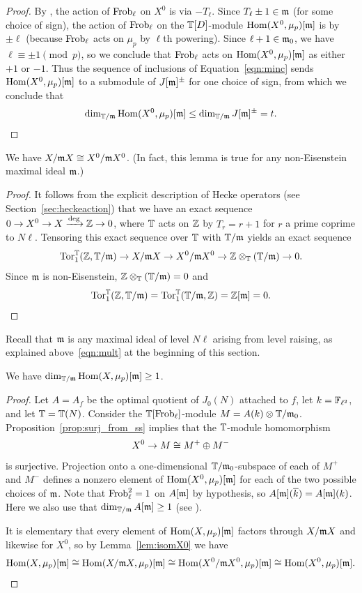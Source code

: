 \documentclass{article} \usepackage[active]{srcltx}
\begin{document}
\begin{proof}
By \cite[Prop.~3.7--3.8]{ribet:modreps}, the action 
of $\operatorname{Frob}_{\ell}$ on $X^0$ is via $-T_{\ell}$.
Since $T_{\ell}\pm 1\in \mathfrak{m}$ (for some choice of sign),
the action of $\operatorname{Frob}_{\ell}$ on the $\mathbb{T}[D]$-module
$\operatorname{Hom}(X^0,  \mu_{p})[\mathfrak{m}]$ is by
$\pm \ell$ (because $\operatorname{Frob}_{\ell}$ acts on $\mu_p$ by $\ell$th powering).
Since $\ell+1\in \mathfrak{m}_0$, we have $\ell\equiv \pm 1\pmod{p}$,
so we conclude that $\operatorname{Frob}_{\ell}$ acts on $\operatorname{Hom}(X^0,  \mu_{p})[\mathfrak{m}]$
as either $+1$ or $-1$.
Thus the sequence of inclusions of Equation~\eqref{eqn:minc} 
sends $\operatorname{Hom}(X^0,  \mu_{p})[\mathfrak{m}]$ to a submodule
of $J[\mathfrak{m}]^{\pm}$ for one choice of sign, from which we conclude that
$$
  \dim_{\mathbb{T}/\mathfrak{m}}   \operatorname{Hom}(X^0,  \mu_{p})[\mathfrak{m}] \leq \dim_{\mathbb{T}/\mathfrak{m}} J[\mathfrak{m}]^{\pm} = t.
$$
\end{proof}


\begin{lemma}\label{lem:isomX0}
  We have $X/\mathfrak{m} X \cong X^0/ \mathfrak{m} X^0$.  (In fact, this lemma is true
  for any non-Eisenstein maximal ideal $\mathfrak{m}$.)
\end{lemma}
\begin{proof}
It follows from the explicit description of Hecke operators (see Section~\ref{sec:heckeaction})
that we have an exact sequence $0 \to X^0 \to X \xrightarrow{\deg} \mathbb{Z} \to
  0$, where $\mathbb{T}$ acts on $\mathbb{Z}$ by $T_r = r+1$ for $r$ a prime coprime
  to $N\ell$.  Tensoring this exact sequence over $\mathbb{T}$ with $\mathbb{T}/\mathfrak{m}$ yields an exact sequence
$$\operatorname{Tor}_1^{\mathbb{T}}(\mathbb{Z},\mathbb{T}/\mathfrak{m}) \to X/\mathfrak{m} X \to X^0/ \mathfrak{m} X^0 \to \mathbb{Z}\otimes_{\mathbb{T}}(\mathbb{T}/\mathfrak{m}) \to 0.$$
Since $\mathfrak{m}$ is non-Eisenstein, $\mathbb{Z}\otimes_{\mathbb{T}}(\mathbb{T}/\mathfrak{m})=0$
and $$\operatorname{Tor}_1^{\mathbb{T}}(\mathbb{Z},\mathbb{T}/\mathfrak{m}) = \operatorname{Tor}_1^{\mathbb{T}}(\mathbb{T}/\mathfrak{m},\mathbb{Z}) = \mathbb{Z}[\mathfrak{m}]=0.$$
\end{proof}

Recall that $\mathfrak{m}$ is any maximal ideal of level $N\ell$ arising from
level raising, as explained above~\eqref{eqn:mult} at the beginning of
this section.


\begin{proposition}
We have 
$ \dim_{\mathbb{T}/\mathfrak{m}} \operatorname{Hom}(X,\mu_p)[\mathfrak{m}] \geq 1$.
\end{proposition}
\begin{proof}
  Let $A=A_f$ be the optimal quotient of $J_0(N)$ attached to $f$, 
  let $k=\mathbb{F}_{\ell^2}$, and let $\mathbb{T}=\mathbb{T}(N)$.
Consider the $\mathbb{T}[\operatorname{Frob}_{\ell}]$-module $M= A(k)\otimes \mathbb{T}/\mathfrak{m}_0$. 
Proposition~\ref{prop:surj_from_ss} implies
  that the $\mathbb{T}$-module homomorphism 
$$
  X^0 \to M \cong M^+ \oplus M^-
$$ 
is surjective.  Projection onto a one-dimensional $\mathbb{T}/\mathfrak{m}_0$-subspace
of each of $M^+$ and $M^-$ defines a nonzero element of $\operatorname{Hom}(X^0,
\mu_p)[\mathfrak{m}]$ for each of the two possible choices of $\mathfrak{m}$.  Note that
$\operatorname{Frob}_\ell^2 = 1$ on $A[\mathfrak{m}]$ by hypothesis, so $A[\mathfrak{m}](\overline{k})
= A[\mathfrak{m}](k)$.  Here we also use that $\dim_{\mathbb{T}/\mathfrak{m}} A[\mathfrak{m}] \geq 1$ (see
\cite[\S3.3]{ribet-stein:serre}).

It is elementary that every element of $\operatorname{Hom}(X,\mu_p)[\mathfrak{m}]$ factors 
through $X/\mathfrak{m} X$ and likewise for $X^0$, so by Lemma~\ref{lem:isomX0} we have
$$\operatorname{Hom}(X, \mu_p)[\mathfrak{m}]
   \cong \operatorname{Hom}(X/\mathfrak{m} X, \mu_p)[\mathfrak{m}]
   \cong \operatorname{Hom}(X^0/\mathfrak{m} X^0, \mu_p)[\mathfrak{m}] 
\cong \operatorname{Hom}(X^0, \mu_p)[\mathfrak{m}].$$
\end{proof}
\end{document}
